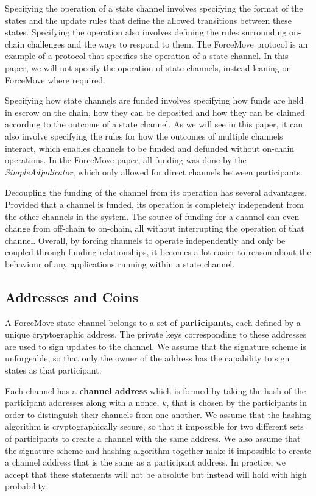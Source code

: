 \documentclass{article}
\begin{document}
Specifying the operation of a state channel involves specifying the format of the states and the update rules that define the allowed transitions between these states.
Specifying the operation also involves defining the rules surrounding on-chain challenges and the ways to respond to them.
The ForceMove protocol is an example of a protocol that specifies the operation of a state channel.
In this paper, we will not specify the operation of state channels, instead leaning on ForceMove where required.

Specifying how state channels are funded involves specifying how funds are held in escrow on the chain, how they can be deposited and how they can be claimed according to the outcome of a state channel.
As we will see in this paper, it can also involve specifying the rules for how the outcomes of multiple channels interact, which enables channels to be funded and defunded without on-chain operations.
In the ForceMove paper, all funding was done by the \textit{SimpleAdjudicator}, which only allowed for direct channels between participants.

Decoupling the funding of the channel from its operation has several advantages.
Provided that a channel is funded, its operation is completely independent from the other channels in the system.
The source of funding for a channel can even change from off-chain to on-chain, all without interrupting the operation of that channel.
Overall, by forcing channels to operate independently and only be coupled through funding relationships, it becomes a lot easier to reason about the behaviour of any applications running within a state channel.


\subsection{Addresses and Coins}

A ForceMove state channel belongs to a set of \textbf{participants}, each defined by a unique cryptographic address.
The private keys corresponding to these addresses are used to sign updates to the channel.
We assume that the signature scheme is unforgeable, so that only the owner of the address has the capability to sign states as that participant.

Each channel has a \textbf{channel address} which is formed by taking the hash of the participant addresses along with a nonce, $k$, that is chosen by the participants in order to distinguish their channels from one another.
We assume that the hashing algorithm is cryptographically secure, so that it impossible for two different sets of participants to create a channel with the same address.
We also assume that the signature scheme and hashing algorithm together make it impossible to create a channel address that is the same as a participant address.
In practice, we accept that these statements will not be absolute but instead will hold with high probability.
\end{document}
